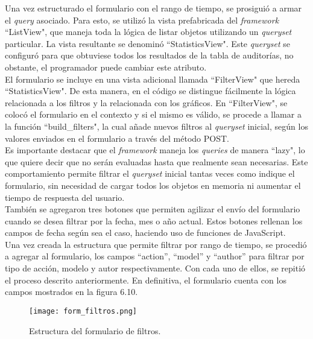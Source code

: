 Una vez estructurado el formulario con el rango de tiempo, se prosiguió a armar el \textit{query} asociado. Para esto, se utilizó la vista prefabricada del \textit{framework} “ListView", que maneja toda la lógica de listar objetos utilizando un \textit{queryset} particular. La vista resultante se denominó “StatisticsView". Este \textit{queryset}  se configuró para que obtuviese todos los resultados de la tabla de auditorías, no obstante, el programador puede cambiar este atributo.\\

El formulario se incluye en una vista adicional llamada “FilterView" que hereda “StatisticsView". De esta manera, en el código se distingue fácilmente la lógica relacionada a los filtros y la relacionada con los gráficos. En “FilterView", se colocó el formulario en el contexto y si el mismo es válido, se procede a llamar a la función “build\_filters", la cual añade nuevos filtros al \textit{queryset} inicial, según los valores enviados en el formulario a través del método POST. \\

Es importante destacar que el \textit{framework} maneja los \textit{queries} de manera “lazy", lo que quiere decir que no serán evaluadas hasta que realmente sean necesarias. Este comportamiento permite filtrar el \textit{queryset} inicial tantas veces como indique el formulario, sin necesidad de cargar todos los objetos en memoria ni aumentar el tiempo de respuesta del usuario.\\

También se agregaron tres botones que permiten agilizar el envío del formulario cuando se desea filtrar por la fecha, mes o año actual. Estos botones rellenan los campos de fecha según sea el caso, haciendo uso de funciones de JavaScript.\\

Una vez creada la estructura que permite filtrar por rango de tiempo, se procedió a agregar al formulario, los campos “action”, “model” y “author” para filtrar por tipo de acción, modelo y autor respectivamente. Con cada uno de ellos, se repitió el proceso descrito anteriormente. En definitiva, el formulario cuenta con los campos mostrados en la figura 6.10.

\begin{figure}[h]
    \centering
    \texttt{[image: form\_filtros.png]}
    \caption{Estructura del formulario de filtros.}
    \label{fig:figura6.10}
\end{figure}

